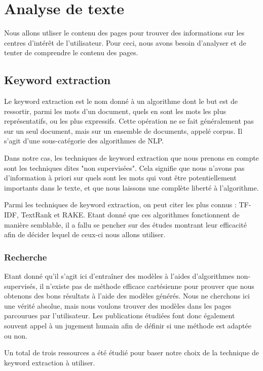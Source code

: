 \section{Analyse de texte}

	Nous allons utliser le contenu des pages pour trouver des informations sur les centres d'intérêt de l'utilisateur. Pour ceci, nous avons besoin d'analyser et de tenter de comprendre le contenu des pages.

	\subsection{Keyword extraction}

		Le keyword extraction est le nom donné à un algorithme dont le but est de ressortir, parmi les mots d'un document, quels en sont les mots les plus représentatifs, ou les plus expressifs. Cette opération ne se fait généralement pas sur un seul document, mais sur un ensemble de documents, appelé corpus. Il s'agit d'une sous-catégorie des algorithmes de \gls{NLP}.

		Dans notre cas, les techniques de keyword extraction que nous prenons en compte sont les techniques dites "non supervisées". Cela signifie que nous n'avons pas d'information à priori sur quels sont les mots qui vont être potentiellement importants dans le texte, et que nous laissons une complète liberté à l'algorithme.

		Parmi les techniques de keyword extraction, on peut citer les plus connus : \gls{TF-IDF}, TextRank et \gls{RAKE}. Etant donné que ces algorithmes fonctionnent de manière semblable, il a fallu se pencher sur des études montrant leur efficacité afin de décider lequel de ceux-ci nous allons utiliser.

		\subsubsection{Recherche}

			Etant donné qu'il s'agit ici d'entraîner des modèles à l'aides d'algorithmes non-supervisés, il n'existe pas de méthode efficace cartésienne pour prouver que nous obtenons des bons résultats à l'aide des modèles générés. Nous ne cherchons ici une vérité absolue, mais nous voulons trouver des modèles dans les pages parcourues par l'utilisateur. Les publications étudiées font donc également souvent appel à un jugement humain afin de définir si une méthode est adaptée ou non.

			Un total de trois ressources a été étudié pour baser notre choix de la technique de keyword extraction à utiliser.

